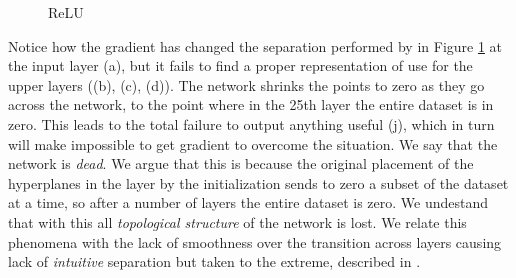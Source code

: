 \begin{figure}
{{    %
    }
    \parbox{.195\textwidth}{%
    }
  }
  \caption{ReLU}
    \label{fig:moonsReLU}
\end{figure}


Notice how the gradient has changed the separation performed by \ReLU in Figure \ref{fig:moonsReLU} at the input layer (a), but it fails to find a proper representation of use for the upper layers ((b), (c), (d)). The network shrinks the points to zero as they go across the network, to the point where in the 25th layer the entire dataset is in zero. This leads to the total failure to output anything useful (j), which in turn will make impossible to get gradient to overcome the situation. We say that the network is \emph{dead}. We argue that this is because the original placement of the hyperplanes in the layer by the initialization sends to zero a subset of the dataset at a time, so after a number of layers the entire dataset is zero. We undestand that with this all \emph{topological structure} of the network is lost. We relate this phenomena with the lack of smoothness over the transition across layers causing lack of \emph{intuitive} separation but taken to the extreme, described in \cite{hauserAsok}.

